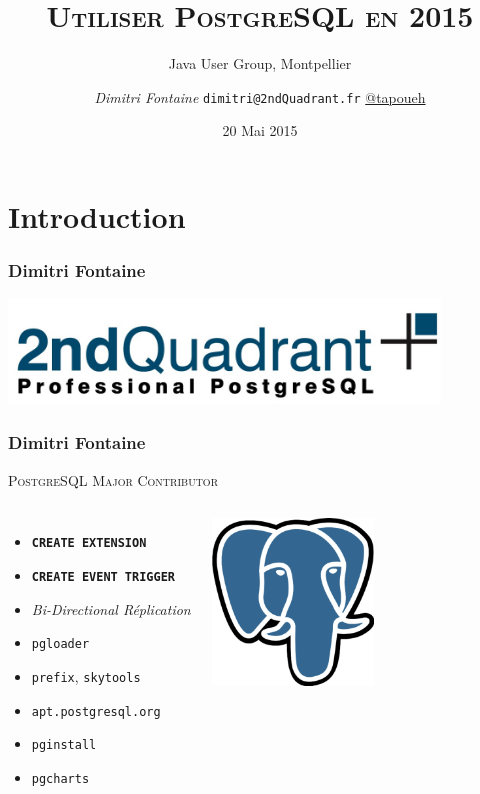 \documentclass{beamer}
\title{\textsc{Utiliser PostgreSQL en 2015}}
\subtitle{Java User Group, Montpellier}
\author{\textit{Dimitri Fontaine} \texttt{dimitri@2ndQuadrant.fr}
  \linebreak
  \url{@tapoueh}}
\date{20 Mai 2015}
\begin{document}
\frame{\titlepage}

\section{Introduction}

\begin{frame}
  \frametitle{Dimitri Fontaine}

  \begin{center}
    \includegraphics[height=1.1in]{2ndquadrant_logo_full_color.jpg}
  \end{center}
\end{frame}

\begin{frame}[fragile]
  \frametitle{Dimitri Fontaine}

  \begin{center}
    {\Large \textsc{PostgreSQL Major Contributor}}
  \end{center}

  \begin{columns}[c]

    \begin{itemize}
    \item \texttt{\textbf{CREATE EXTENSION}}
    \item \texttt{\textbf{CREATE EVENT TRIGGER}}
    \item \textit{Bi-Directional Réplication}
    \item \texttt{pgloader}
    \item \texttt{prefix}, \texttt{skytools}
    \item \texttt{apt.postgresql.org}
    \item \texttt{pginstall}
    \item \texttt{pgcharts}
    \end{itemize}  

    \begin{center}
      \includegraphics[height=12em]{postgres-logo.eps}
    \end{center}
  \end{columns}
\end{frame}
\end{document}
